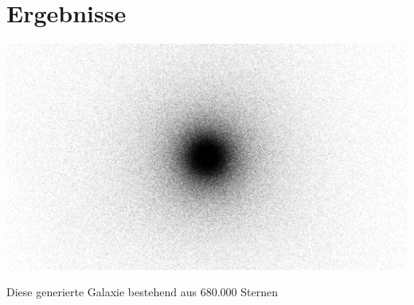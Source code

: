 \section*{Ergebnisse}

\begin{center}\vspace{0.5cm}
\includegraphics[width=0.8\linewidth]{figs/galaxy_flammkuchenblech}
\caption{ Diese generierte Galaxie bestehend aus \( 680.000 \) Sternen}
\label{fig:galaxy_flammkuchenblech}
\end{center}\vspace{-1cm}
